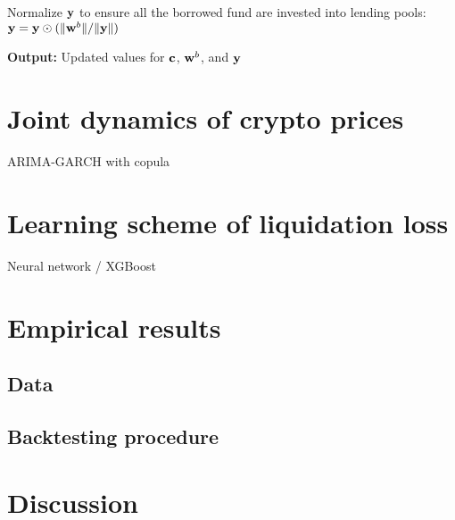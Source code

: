 \documentclass{article} %
\theoremstyle{plain}
\theoremstyle{definition} %
\begin{document}
\begin{algorithm}
\begin{algorithmic}[1]
    \STATE Normalize ${\bf y}$ to ensure all the borrowed fund are invested into lending pools: ${\bf y} = {\bf y} \odot (\|{\bf w}^b\|/ \|{\bf y}\|)$
    
    \STATE \textbf{Output:} Updated values for ${\bf c}$, ${\bf w}^b$, and ${\bf y}$
    \end{algorithmic}
    \end{algorithm}

\section{Joint dynamics of crypto prices}
ARIMA-GARCH with copula

\section{Learning scheme of liquidation loss}\label{sec:ML}
Neural network / XGBoost

\section{Empirical results}
\subsection{Data}
\subsection{Backtesting procedure}

\section{Discussion}

\end{document}
